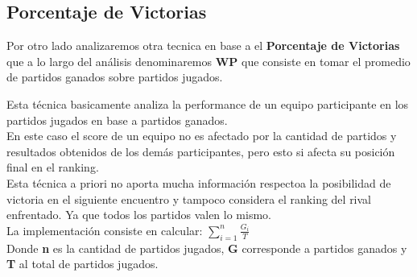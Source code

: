 \newpage
\subsection{Porcentaje de Victorias}

Por otro lado analizaremos otra tecnica en base a el \textbf{Porcentaje de Victorias} que a lo largo del análisis denominaremos \textbf{WP} que consiste en 
tomar el promedio de partidos ganados sobre partidos jugados.

Esta técnica basicamente analiza la performance de un equipo participante en los partidos jugados en base a partidos ganados. \\

En este caso el score de un equipo no es afectado por la cantidad de partidos y resultados obtenidos de los demás participantes, pero esto si afecta su posición final en el ranking. \\

Esta técnica a priori no aporta mucha informaci\'on respectoa la posibilidad de victoria en el siguiente encuentro y tampoco considera el ranking del rival enfrentado.
Ya que todos los partidos valen lo mismo. \\

La implementación consiste en calcular: $\sum_{i=1}^n{} \frac{G_i}{T}$ \\

Donde \textbf{n} es la cantidad de partidos jugados, \textbf{G} corresponde a partidos ganados y \textbf{T} al total de partidos jugados. \\
